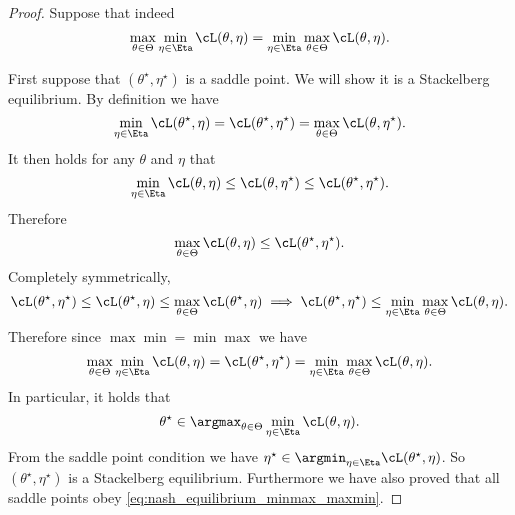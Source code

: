 \documentclass[../../book-main.tex]{subfiles}
\begin{document}
\begin{proof} %
    Suppose that indeed 
    \begin{equation}
        \max_{\theta \in \Theta}\min_{\eta \in \Eta}\cL(\theta, \eta) = \min_{\eta \in \Eta}\max_{\theta  \in \Theta}\cL(\theta, \eta).
    \end{equation}

    First suppose that \((\theta^{\star}, \eta^{\star})\) is a saddle point. We will show it is a Stackelberg equilibrium. By definition we have 
    \begin{equation}
        \min_{\eta \in \Eta}\cL(\theta^{\star}, \eta) = \cL(\theta^{\star}, \eta^{\star}) = \max_{\theta \in \Theta}\cL(\theta, \eta^{\star}).
    \end{equation}
    It then holds for any \(\theta\) and \(\eta\) that 
    \begin{equation}
        \min_{\eta \in \Eta}\cL(\theta, \eta) \leq \cL(\theta, \eta^{\star}) \leq \cL(\theta^{\star}, \eta^{\star}).
    \end{equation}
    Therefore
    \begin{equation}
        \max_{\theta \in \Theta}\cL(\theta, \eta) \leq \cL(\theta^{\star}, \eta^{\star}).
    \end{equation}
    Completely symmetrically, 
    \begin{equation}
        \cL(\theta^{\star}, \eta^{\star}) \leq \cL(\theta^{\star}, \eta) \leq \max_{\theta \in \Theta}\cL(\theta^{\star}, \eta) \implies \cL(\theta^{\star}, \eta^{\star}) \leq \min_{\eta \in \Eta}\max_{\theta \in \Theta}\cL(\theta, \eta).
    \end{equation}
    Therefore since \(\max\min = \min\max\) we have 
    \begin{equation}\label{eq:nash_equilibrium_minmax_maxmin}
        \max_{\theta \in \Theta}\min_{\eta \in \Eta}\cL(\theta, \eta) = \cL(\theta^{\star}, \eta^{\star}) = \min_{\eta \in \Eta}\max_{\theta \in \Theta}\cL(\theta, \eta).
    \end{equation}
    In particular, it holds that
    \begin{equation}
        \theta^{\star} \in \argmax_{\theta \in \Theta}\min_{\eta \in \Eta}\cL(\theta, \eta).
    \end{equation}
    From the saddle point condition we have \(\eta^{\star} \in \argmin_{\eta \in \Eta}\cL(\theta^{\star}, \eta)\). So \((\theta^{\star}, \eta^{\star})\) is a Stackelberg equilibrium. Furthermore we have also proved that all saddle points obey \eqref{eq:nash_equilibrium_minmax_maxmin}.


\end{proof}
\end{document}
